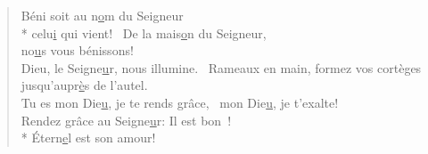 \begin{verse}
Béni soit au n\underline{o}m du Seigneur \\*
celu\underline{i} qui vient!~\psalmstar
De la mais\underline{o}n du Seigneur, \\
no\underline{u}s vous bénissons! \\

Dieu, le Seigne\underline{u}r, nous illumine.~\psalmstar
Rameaux en main, formez vos cortèges
jusqu’aupr\underline{è}s de l’autel. \\

Tu es mon Die\underline{u}, je te rends grâce,~\psalmstar
mon Die\underline{u}, je t’exalte! \\

Rendez grâce au Seigne\underline{u}r: Il est bon ! \\*
Étern\underline{e}l est son amour! \\

\end{verse}


